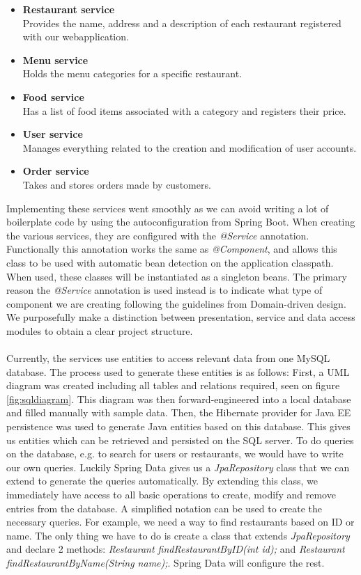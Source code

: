 \documentclass[12pt]{article}
\begin{document}
\begin{multicols}{2}
\begin{itemize}
	\raggedright
	\item \textbf{Restaurant service}\\Provides the name, address and a description of each restaurant registered with our webapplication.
	\item \textbf{Menu service}\\Holds the menu categories for a specific restaurant.
	\item \textbf{Food service}\\Has a list of food items associated with a category and registers their price.
	\item \textbf{User service}\\Manages everything related to the creation and modification of user accounts.
	\item \textbf{Order service}\\Takes and stores orders made by customers.
\end{itemize} 
Implementing these services went smoothly as we can avoid writing a lot of boilerplate code by using the autoconfiguration from Spring Boot. When creating the various services, they are configured with the \textit{@Service} annotation. Functionally this annotation works the same as \textit{@Component}, and allows this class to be used with automatic bean detection on the application classpath. When used, these classes will be instantiated as a singleton beans. The primary reason the \textit{@Service} annotation is used instead is to indicate what type of component we are creating following the guidelines from Domain-driven design. \cite{ComponentAnnotationDifferences34:online} \cite{ServiceAnnotationSpring48:online} We purposefully make a distinction between presentation, service and data access modules to obtain a clear project structure.
\\\\
Currently, the services use entities to access relevant data from one MySQL database. The process used to generate these entities is as follows: First, a UML diagram was created including all tables and relations required, seen on figure \ref{fig:sqldiagram}. This diagram was then forward-engineered into a local database and filled manually with sample data. Then, the Hibernate provider for Java EE persistence was used to generate Java entities based on this database. This gives us entities which can be retrieved and persisted on the SQL server. To do queries on the database, e.g. to search for users or restaurants, we would have to write our own queries. Luckily Spring Data gives us a \textit{JpaRepository} class that we can extend to generate the queries automatically. By extending this class, we immediately have access to all basic operations to create, modify and remove entries from the database. A simplified notation can be used to create the necessary queries. For example, we need a way to find restaurants based on ID or name. The only thing we have to do is create a class that extends \textit{JpaRepository} and declare 2 methods: \textit{Restaurant findRestaurantByID(int id);} and \textit{Restaurant findRestaurantByName(String name);}. Spring Data will configure the rest.

\end{multicols}
\end{document}
